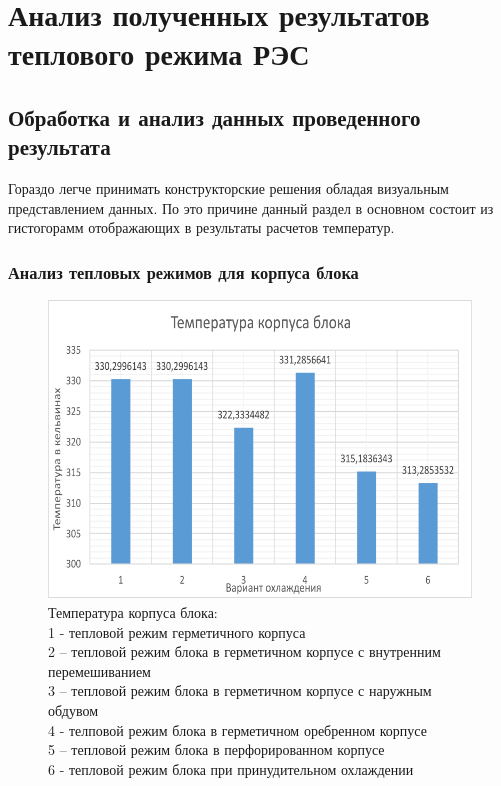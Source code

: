 \section{Анализ полученных результатов теплового режима РЭС}
\subsection{Обработка и анализ данных проведенного результата}

Гораздо легче принимать конструкторские решения обладая визуальным
представлением данных. По это причине данный раздел в основном состоит
из гистогорамм отображающих в результаты расчетов температур.




\subsubsection{Анализ тепловых режимов для корпуса блока}
\begin{figure}[h] %
\begin{center}
\includegraphics[scale = 0.4]{images2/t_corp.png}
\caption{Температура корпуса блока:\\
  1 - тепловой режим герметичного корпуса\\
  2 – тепловой режим блока в герметичном корпусе с внутренним перемешиванием\\
  3 – тепловой режим блока в герметичном корпусе с наружным обдувом\\
  4 - телповой режим блока в  герметичном оребренном корпусе \\
  5 – тепловой режим блока в перфорированном корпусе \\
  6 - тепловой режим блока при принудительном охлаждении}
\end{center}

\end{figure}

